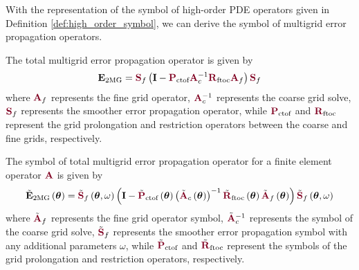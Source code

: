With the representation of the symbol of high-order PDE operators given in Definition \ref{def:high_order_symbol}, we can derive the symbol of multigrid error propagation operators.

The total multigrid error propagation operator is given by
\begin{equation}
\mathbf{E}_{\text{2MG}} = {\color{burgundy}\mathbf{S}}_f \left( \mathbf{I} - {\color{burgundy}\mathbf{P}}_{\text{ctof}} {\color{burgundy}\mathbf{A}}_c^{-1} {\color{burgundy}\mathbf{R}}_{\text{ftoc}} {\color{burgundy}\mathbf{A}}_f \right) {\color{burgundy}\mathbf{S}}_f
\end{equation}
where ${\color{burgundy}\mathbf{A}}_f$ represents the fine grid operator, ${\color{burgundy}\mathbf{A}}_c^{-1}$ represents the coarse grid solve, ${\color{burgundy}\mathbf{S}}_f$ represents the smoother error propagation operator, while ${\color{burgundy}\mathbf{P}}_{\text{ctof}}$ and ${\color{burgundy}\mathbf{R}}_{\text{ftoc}}$ represent the grid prolongation and restriction operators between the coarse and fine grids, respectively.

\begin{definition}
The symbol of total multigrid error propagation operator for a finite element operator ${\color{burgundy}\mathbf{A}}$ is given by
\begin{equation}
\tilde{\mathbf{E}}_{\text{2MG}} \left( \boldsymbol{\theta} \right) = \tilde{{\color{burgundy}\mathbf{S}}}_f \left( \boldsymbol{\theta}, \omega \right) \left( \mathbf{I} - \tilde{{\color{burgundy}\mathbf{P}}}_{\text{ctof}} \left( \boldsymbol{\theta} \right) \left(\tilde{{\color{burgundy}\mathbf{A}}}_c \left( \boldsymbol{\theta} \right) \right)^{-1} \tilde{{\color{burgundy}\mathbf{R}}}_{\text{ftoc}} \left( \boldsymbol{\theta} \right) \tilde{{\color{burgundy}\mathbf{A}}}_f \left( \boldsymbol{\theta} \right) \right) \tilde{{\color{burgundy}\mathbf{S}}}_f \left( \boldsymbol{\theta}, \omega \right)
\end{equation}
where $\tilde{\color{burgundy}\mathbf{A}}_f$ represents the fine grid operator symbol, $\tilde{\color{burgundy}\mathbf{A}}_c^{-1}$ represents the symbol of the coarse grid solve, $\tilde{{\color{burgundy}\mathbf{S}}}_f$ represents the smoother error propagation symbol with any additional parameters $\omega$, while $\tilde{{\color{burgundy}\mathbf{P}}}_{\text{ctof}}$ and $\tilde{{\color{burgundy}\mathbf{R}}}_{\text{ftoc}}$ represent the symbols of the grid prolongation and restriction operators, respectively.
\label{def:multigrid_symbol}
\end{definition}

